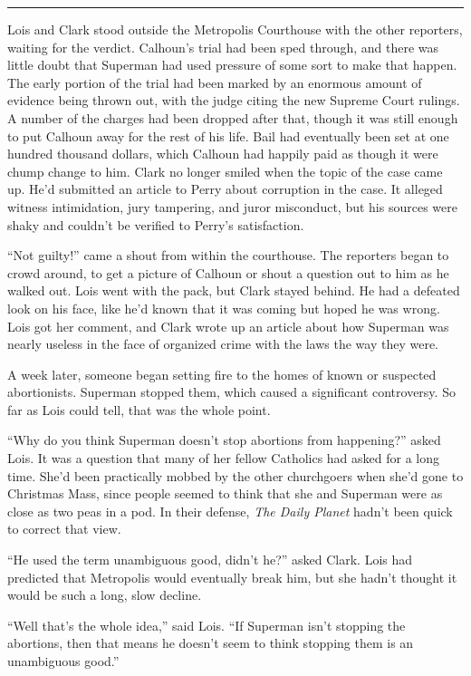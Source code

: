 \begin{center}\rule{0.5\linewidth}{\linethickness}\end{center}

Lois and Clark stood outside the Metropolis Courthouse with the other
reporters, waiting for the verdict. Calhoun's trial had been sped
through, and there was little doubt that Superman had used pressure of
some sort to make that happen. The early portion of the trial had been
marked by an enormous amount of evidence being thrown out, with the
judge citing the new Supreme Court rulings. A number of the charges had
been dropped after that, though it was still enough to put Calhoun away
for the rest of his life. Bail had eventually been set at one hundred
thousand dollars, which Calhoun had happily paid as though it were chump
change to him. Clark no longer smiled when the topic of the case came
up. He'd submitted an article to Perry about corruption in the case. It
alleged witness intimidation, jury tampering, and juror misconduct, but
his sources were shaky and couldn't be verified to Perry's satisfaction.

``Not guilty!'' came a shout from within the courthouse. The reporters
began to crowd around, to get a picture of Calhoun or shout a question
out to him as he walked out. Lois went with the pack, but Clark stayed
behind. He had a defeated look on his face, like he'd known that it was
coming but hoped he was wrong. Lois got her comment, and Clark wrote up
an article about how Superman was nearly useless in the face of
organized crime with the laws the way they were.

A week later, someone began setting fire to the homes of known or
suspected abortionists. Superman stopped them, which caused a
significant controversy. So far as Lois could tell, that was the whole
point.

``Why do you think Superman doesn't stop abortions from happening?''
asked Lois. It was a question that many of her fellow Catholics had
asked for a long time. She'd been practically mobbed by the other
churchgoers when she'd gone to Christmas Mass, since people seemed to
think that she and Superman were as close as two peas in a pod. In their
defense, \emph{The Daily Planet} hadn't been quick to correct that view.

``He used the term unambiguous good, didn't he?'' asked Clark. Lois had
predicted that Metropolis would eventually break him, but she hadn't
thought it would be such a long, slow decline.

``Well that's the whole idea,'' said Lois. ``If Superman isn't stopping
the abortions, then that means he doesn't seem to think stopping them is
an unambiguous good.''

